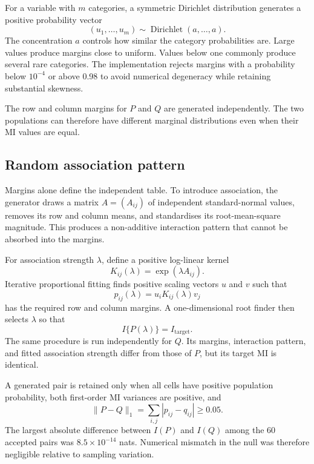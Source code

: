 For a variable with \(m\) categories, a symmetric Dirichlet distribution
generates a positive probability vector
\begin{equation}
  (u_1,\ldots,u_m)
  \sim\operatorname{Dirichlet}(a,\ldots,a).
  \label{eq:dirichlet-margin}
\end{equation}
The concentration \(a\) controls how similar the category probabilities are.
Large values produce margins close to uniform. Values below one commonly
produce several rare categories. The implementation rejects margins with a
probability below \(10^{-4}\) or above 0.98 to avoid numerical degeneracy while
retaining substantial skewness.

The row and column margins for \(P\) and \(Q\) are generated independently.
The two populations can therefore have different marginal distributions even
when their MI values are equal.

\subsection{Random association pattern}

Margins alone define the independent table. To introduce association, the
generator draws a matrix \(A=(A_{ij})\) of independent standard-normal values,
removes its row and column means, and standardises its root-mean-square
magnitude. This produces a non-additive interaction pattern that cannot be
absorbed into the margins.

For association strength \(\lambda\), define a positive log-linear kernel
\begin{equation}
  K_{ij}(\lambda)=\exp(\lambda A_{ij}).
\end{equation}
Iterative proportional fitting finds positive scaling vectors \(u\) and \(v\)
such that
\begin{equation}
  p_{ij}(\lambda)=u_iK_{ij}(\lambda)v_j
  \label{eq:loglinear-table}
\end{equation}
has the required row and column margins. A one-dimensional root finder then
selects \(\lambda\) so that
\begin{equation}
  I\{P(\lambda)\}=I_{\mathrm{target}}.
\end{equation}
The same procedure is run independently for \(Q\). Its margins, interaction
pattern, and fitted association strength differ from those of \(P\), but its
target MI is identical.

A generated pair is retained only when all cells have positive population
probability, both first-order MI variances are positive, and
\begin{equation}
  \lVert P-Q\rVert_1
  =\sum_{i,j}|p_{ij}-q_{ij}|
  \ge 0.05.
  \label{eq:l1-population-separation}
\end{equation}
The largest absolute difference between \(I(P)\) and \(I(Q)\) among the 60
accepted pairs was \(8.5\times10^{-14}\) nats. Numerical mismatch in the null
was therefore negligible relative to sampling variation.

